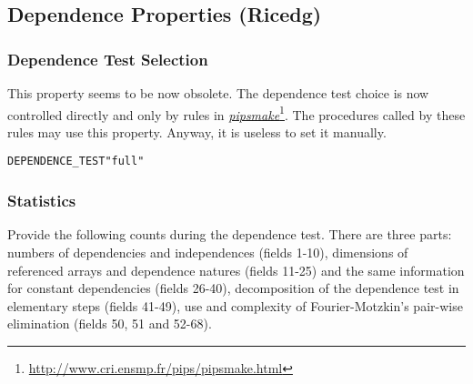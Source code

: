 \documentclass[a4paper]{report}
\newenvironment{PipsProp}{\begin{alltt}}{\end{alltt}}
\newcommand{\LINK}[2]{\href{#2}{#1}\footnote{\url{#2}}\xspace}
\newcommand{\PIPSMAKE}{\LINK{\emph{pipsmake}}{http://www.cri.ensmp.fr/pips/pipsmake.html}\xspace}
\begin{document}
\subsection{Dependence Properties (Ricedg)}


\subsubsection{Dependence Test Selection}

This property seems to be now obsolete. The dependence test choice is
now controlled directly and only by rules in \PIPSMAKE{}. The procedures
called by these rules may use this property. Anyway, it is useless to
set it manually.

\begin{PipsProp}
DEPENDENCE_TEST "full"
\end{PipsProp}


\subsubsection{Statistics}

Provide the following counts during the dependence test. There are three
parts: numbers of dependencies and independences (fields 1-10),
dimensions of referenced arrays and dependence natures (fields 11-25)
and the same information for constant dependencies (fields 26-40),
decomposition of the dependence test in elementary steps (fields 41-49),
use and complexity of Fourier-Motzkin's pair-wise elimination (fields
50, 51 and 52-68).
\end{document}
